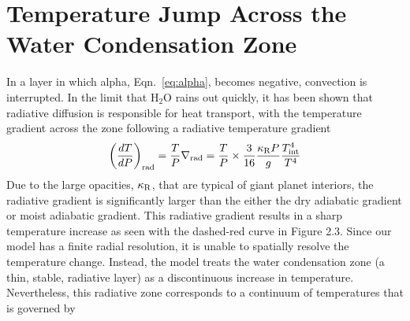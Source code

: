 \documentclass[11pt]{ucscthesisbs}
\begin{document}
\section{Temperature Jump Across the Water Condensation Zone}
In a layer in which alpha, Eqn.~\ref{eq:alpha}, becomes negative, convection is interrupted. In the limit that H$_{2}$O rains out quickly, \citep{friedson_2017,leconte_2017} it has been shown that radiative diffusion is responsible for heat transport, with the temperature gradient across the zone following a radiative temperature gradient \citep{kippenhahn_2012} 
\begin{align}
  \left(\frac{dT}{dP}\right)_{\rm rad}=\frac{T}{P}\nabla_{\rm rad}
  = \frac{T}{P}\times\frac{3}{16}\frac{\kappa_{\rm R} P}{g}\frac{T_{\rm int}^4}{T^4}
  \label{eq:radiative_gradient}
\end{align}
Due to the large opacities, $\kappa_{\rm R}$, that are typical of giant planet interiors, the radiative gradient is significantly larger than the either the dry adiabatic gradient or moist adiabatic gradient. This radiative gradient results in a sharp temperature increase as seen with the dashed-red curve in Figure 2.3. Since our model has a finite radial resolution, it is unable to spatially resolve the temperature change. Instead, the model treats the water condensation zone (a thin, stable, radiative layer) as a discontinuous increase in temperature. Nevertheless, this radiative zone corresponds to a continuum of temperatures that is governed by
\end{document}
